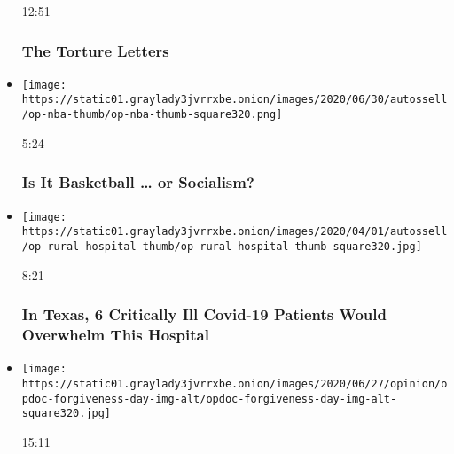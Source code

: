 \begin{itemize}
  12:51

  \hypertarget{the-torture-letters}{%
  \subsubsection{The Torture Letters}\label{the-torture-letters}}
\item
  \href{https://www.nytimes3xbfgragh.onion/video/opinion/100000007182805/income-inequality-nba-socialism.html?action=click\&module=video-series-bar\&region=header\&pgtype=Article\&playlistId=video/opinion}{}

  \texttt{[image: https://static01.graylady3jvrrxbe.onion/images/2020/06/30/autossell/op-nba-thumb/op-nba-thumb-square320.png]}

  5:24

  \hypertarget{is-it-basketball--or-socialism}{%
  \subsubsection{Is It Basketball \ldots{} or
  Socialism?}\label{is-it-basketball--or-socialism}}
\item
  \href{https://www.nytimes3xbfgragh.onion/video/opinion/100000007105817/coronavirus-texas-hospital.html?action=click\&module=video-series-bar\&region=header\&pgtype=Article\&playlistId=video/opinion}{}

  \texttt{[image: https://static01.graylady3jvrrxbe.onion/images/2020/04/01/autossell/op-rural-hospital-thumb/op-rural-hospital-thumb-square320.jpg]}

  8:21

  \hypertarget{in-texas-6-critically-ill-covid-19-patients-would-overwhelm-this-hospital}{%
  \subsubsection{In Texas, 6 Critically Ill Covid-19 Patients Would
  Overwhelm This
  Hospital}\label{in-texas-6-critically-ill-covid-19-patients-would-overwhelm-this-hospital}}
\item
  \href{https://www.nytimes3xbfgragh.onion/video/opinion/100000007172575/forgiveness-day.html?action=click\&module=video-series-bar\&region=header\&pgtype=Article\&playlistId=video/opinion}{}

  \texttt{[image: https://static01.graylady3jvrrxbe.onion/images/2020/06/27/opinion/opdoc-forgiveness-day-img-alt/opdoc-forgiveness-day-img-alt-square320.jpg]}

  15:11


\end{itemize}
